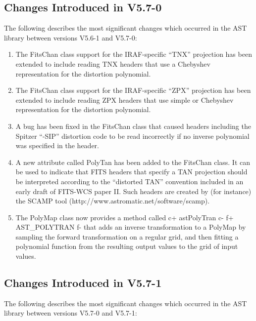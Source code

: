 \documentclass[twoside,11pt]{article}
\newcommand{\htmladdnormallink}[2]{#1}
\begin{document}
\subsection{Changes Introduced in V5.7-0}

The following describes the most significant changes which
occurred in the AST library between versions V5.6-1 and V5.7-0:

\begin{enumerate}

\item The FitsChan class support for the IRAF-specific ``TNX'' projection has
been extended to include reading TNX headers that use a Chebyshev
representation for the distortion polynomial.

\item The FitsChan class support for the IRAF-specific ``ZPX'' projection has
been extended to include reading ZPX headers that use simple or Chebyshev
representation for the distortion polynomial.

\item A bug has been fixed in the FitsChan class that caused headers
including the Spitzer ``-SIP'' distortion code to be read incorrectly if no
inverse polynomial was specified in the header.

\item A new attribute called PolyTan has been added to the FitsChan class. It
can be used to indicate that FITS headers that specify a TAN projection
should be interpreted according to the ``distorted TAN'' convention
included in an early draft of FITS-WCS paper II. Such headers are created
by (for instance) the SCAMP tool (\htmladdnormallink{http://www.astromatic.net/software/scamp}{http://www.astromatic.net/software/scamp}).

\item The PolyMap class now provides a method called
c+
astPolyTran
c-
f+
AST\_POLYTRAN
f-
that adds an inverse transformation to a PolyMap by sampling the forward
transformation on a regular grid, and then fitting a polynomial function
from the resulting output values to the grid of input values.

\end{enumerate}

\subsection{Changes Introduced in V5.7-1}

The following describes the most significant changes which
occurred in the AST library between versions V5.7-0 and V5.7-1:
\end{document}
